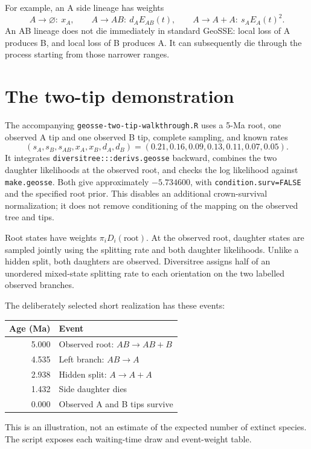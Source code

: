 \documentclass[11pt,a4paper]{article}
\begin{document}
For example, an A side lineage has weights
\[
A\to\varnothing:\ x_A,\qquad
A\to AB:\ d_AE_{AB}(t),\qquad
A\to A+A:\ s_AE_A(t)^2.
\]
An AB lineage does not die immediately in standard GeoSSE: local loss of A
produces B, and local loss of B produces A. It can subsequently die through
the process starting from those narrower ranges.

\section{The two-tip demonstration}
The accompanying \texttt{geosse-two-tip-walkthrough.R} uses a 5-Ma root,
one observed A tip and one observed B tip, complete sampling, and known rates
\[
(s_A,s_B,s_{AB},x_A,x_B,d_A,d_B)
=(0.21,0.16,0.09,0.13,0.11,0.07,0.05).
\]
It integrates \texttt{diversitree:::derivs.geosse} backward, combines the two
daughter likelihoods at the observed root, and checks the log likelihood
against \texttt{make.geosse}. Both give approximately \(-5.734600\), with
\texttt{condition.surv=FALSE} and the specified root prior. This disables an
additional crown-survival normalization; it does not remove conditioning of
the mapping on the observed tree and tips.

Root states have weights \(\pi_iD_i(\text{root})\). At the observed root,
daughter states are sampled jointly using the splitting rate and both daughter
likelihoods. Unlike a hidden split, both daughters are observed. Diversitree
assigns half of an unordered mixed-state splitting rate to each orientation
on the two labelled observed branches.

The deliberately selected short realization has these events:
\begin{center}
\begin{tabular}{rl}
\toprule
Age (Ma)&Event\\\midrule
5.000&Observed root: \(AB\to AB+B\)\\
4.535&Left branch: \(AB\to A\)\\
2.938&Hidden split: \(A\to A+A\)\\
1.432&Side daughter dies\\
0.000&Observed A and B tips survive\\\bottomrule
\end{tabular}
\end{center}
This is an illustration, not an estimate of the expected number of extinct
species. The script exposes each waiting-time draw and event-weight table.

\newpage
\end{document}
